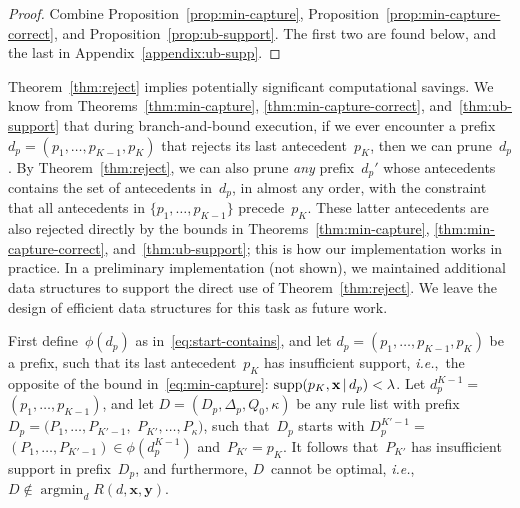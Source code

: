 \documentclass[twoside,11pt]{article}
\def\ie{{\it i.e.},~}
\newcommand{\x}{\mathbf{x}}
\newcommand{\y}{\mathbf{y}}
\def\RL{{d}}
\def\Prefix{d_p}
\def\RLB{{D}}
\def\PrefixB{D_p}
\def\LabelsB{\Delta_p}
\def\DefaultB{Q_0}
\def\Obj{R}
\def\Reg{{\lambda}}
\def\Supp{\textnormal{supp}}
\def\StartContains{\phi}
\DeclareMathOperator*{\argmin}{argmin}
\newcommand{\given}{\,|\,}
\begin{document}
\begin{arxiv}
\begin{proof}
Combine Proposition~\ref{prop:min-capture}, Proposition~\ref{prop:min-capture-correct},
and Proposition~\ref{prop:ub-support}.
%
The first two are found below, and the last in Appendix~\ref{appendix:ub-supp}.
\end{proof}

Theorem~\ref{thm:reject} implies potentially significant
computational savings.
%
We know from Theorems~\ref{thm:min-capture},
\ref{thm:min-capture-correct}, and~\ref{thm:ub-support}
that during branch-and-bound execution, if we ever encounter a
prefix ${\Prefix = (p_1, \dots, p_{K-1}, p_K)}$ that rejects its
last antecedent~$p_K$, then we can prune~$\Prefix$.
%
By Theorem~\ref{thm:reject}, we can also prune \emph{any} prefix~$\Prefix'$
whose antecedents contains the set of antecedents in~$\Prefix$,
in almost any order, with the constraint that all antecedents
in ${\{p_1, \dots, p_{K-1}\}}$ precede~$p_K$.
%
These latter antecedents are also rejected
directly by the bounds in Theorems~\ref{thm:min-capture},
\ref{thm:min-capture-correct}, and~\ref{thm:ub-support};
this is how our implementation works in practice.
%
In a preliminary implementation (not shown), we maintained additional
data structures to support the direct use of Theorem~\ref{thm:reject}.
%
We leave the design of efficient data structures for this task as future work.

\begin{proposition}
\label{prop:min-capture}
First define~$\StartContains(\Prefix)$ as in~\eqref{eq:start-contains},
and let ${\Prefix = (p_1, \dots, p_{K-1}, p_{K})}$ be a prefix,
such that its last antecedent~$p_{K}$ has insufficient support,
\ie the opposite of the bound in~\eqref{eq:min-capture}:
${\Supp(p_K, \x \given \Prefix) < \Reg}$.
%
Let ${\Prefix^{K-1} =}$ ${(p_1, \dots, p_{K-1})}$,
and let ${\RLB = (\PrefixB, \LabelsB, \DefaultB, \kappa)}$
be any rule list with prefix
${\PrefixB = (P_1, \dots, P_{K'-1},}$ ${P_{K'}, \dots, P_{\kappa})}$,
such that~$\PrefixB$ starts with ${\PrefixB^{K'-1} =}$
${(P_1, \dots, P_{K'-1}) \in \StartContains(\Prefix^{K-1})}$
and~${P_{K'} = p_{K}}$.
%
It follows that~$P_{K'}$ has insufficient support in
prefix~$\PrefixB$, and furthermore, $\RLB$~cannot be optimal,
\ie ${\RLB \notin \argmin_{\RL} \Obj(\RL, \x, \y)}$.
\end{proposition}


\end{arxiv}
\end{document}
